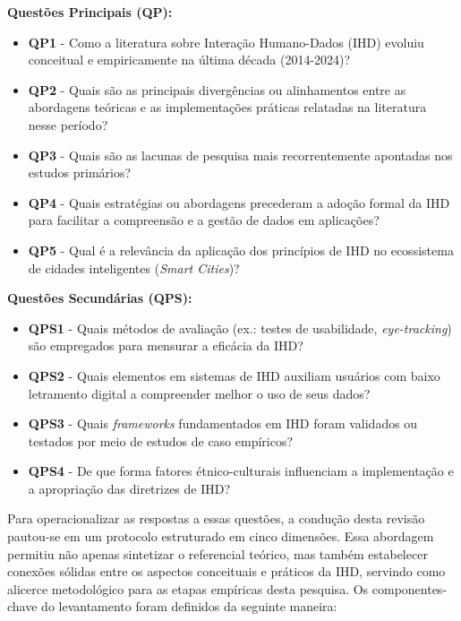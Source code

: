 \documentclass[
	12pt,				%
	oneside,			%
	a4paper,			%
	english,			%
	brazil				%
	]{abntex2ppgsi}
\begin{document}
\textbf{Questões Principais (QP):}
\begin{itemize}
    \item[] \textbf{QP1} - Como a literatura sobre Interação Humano-Dados (IHD) evoluiu conceitual e empiricamente na última década (2014-2024)?
    \item[] \textbf{QP2} - Quais são as principais divergências ou alinhamentos entre as abordagens teóricas e as implementações práticas relatadas na literatura nesse período?
    \item[] \textbf{QP3} - Quais são as lacunas de pesquisa mais recorrentemente apontadas nos estudos primários?
    \item[] \textbf{QP4} - Quais estratégias ou abordagens precederam a adoção formal da IHD para facilitar a compreensão e a gestão de dados em aplicações?
    \item[] \textbf{QP5} - Qual é a relevância da aplicação dos princípios de IHD no ecossistema de cidades inteligentes (\textit{Smart Cities})?
\end{itemize}

\textbf{Questões Secundárias (QPS):}
\begin{itemize}
    \item[] \textbf{QPS1} - Quais métodos de avaliação (ex.: testes de usabilidade, \textit{eye-tracking}) são empregados para mensurar a eficácia da IHD?
    \item[] \textbf{QPS2} - Quais elementos em sistemas de IHD auxiliam usuários com baixo letramento digital a compreender melhor o uso de seus dados?
    \item[] \textbf{QPS3} - Quais \textit{frameworks} fundamentados em IHD foram validados ou testados por meio de estudos de caso empíricos?
    \item[] \textbf{QPS4} - De que forma fatores étnico-culturais influenciam a implementação e a apropriação das diretrizes de IHD?
\end{itemize}

    Para operacionalizar as respostas a essas questões, a condução desta revisão pautou-se em um protocolo estruturado em cinco dimensões. Essa abordagem permitiu não apenas sintetizar o referencial teórico, mas também estabelecer conexões sólidas entre os aspectos conceituais e práticos da IHD, servindo como alicerce metodológico para as etapas empíricas desta pesquisa. Os componentes-chave do levantamento foram definidos da seguinte maneira:
\end{document}
